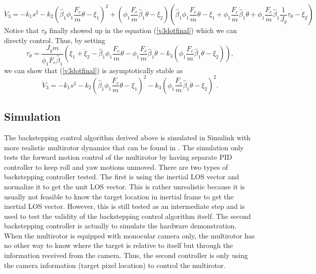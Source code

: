 \begin{equation}
\dot{V}_3=-k_1s^2-k_2(\hat{\beta}_1\phi_1\frac{F_e}{m}\theta-\xi_1)^2+(\phi_1\frac{F_e}{m}\hat{\beta}_1\dot{\theta}-\xi_2)
(\hat{\beta}_1\phi_1\frac{F_e}{m}\theta-\xi_1+\phi_1\frac{F_e}{m}\dot{\hat{\beta}}_1\dot{\theta}+\phi_1\frac{F_e}{m}\hat{\beta}_1\frac{1}{J_y}\tau_\theta-\dot{\xi}_2)
\label{v3dotfinal}
\end{equation}
Notice that $\tau_\theta$ finally showed up in the equation (\ref{v3dotfinal}) which we can directly control. Thus, by setting 
\begin{equation}
\tau_\theta=\frac{J_ym}{\phi_1F_e\hat{\beta}_1}
(\xi_1+\dot{\xi}_2-\hat{\beta}_1\phi_1\frac{F_e}{m}\theta-\phi_1\frac{F_e}{m}\dot{\hat{\beta}}_1\dot{\theta}-k_3(\phi_1\frac{F_e}{m}\hat{\beta}_1\dot{\theta}-\xi_2)),
\end{equation}
we can show that (\ref{v3dotfinal}) is asymptotically stable as
\begin{equation}
\dot{V}_3=-k_1s^2-k_2(\hat{\beta}_1\phi_1\frac{F_e}{m}\theta-\xi_1)^2-k_3(\phi_1\frac{F_e}{m}\hat{\beta}_1\dot{\theta}-\xi_2)^2.
\end{equation}

\subsection{Simulation}
The backstepping control algorithm derived above is simulated in Simulink with more realistic multirotor dynamics that can be found in {\cite{Beard2008}}. The simulation only tests the forward motion control of the multirotor by having separate PID controller to keep roll and yaw motions unmoved. There are two types of backstepping controller tested. The first is using the inertial LOS vector and normalize it to get the unit LOS vector. This is rather unrealistic because it is usually not feasible to know the target location in inertial frame to get the inertial LOS vector. However, this is still tested as an intermediate step and is used to test the validity of the backstepping control algorithm itself. The second backstepping controller is actually to simulate the hardware demonstration. When the multirotor is equipped with monocular camera only, the multirotor has no other way to know where the target is relative to itself but through the information received from the camera. Thus, the second controller is only using the camera information (target pixel location) to control the multirotor. 